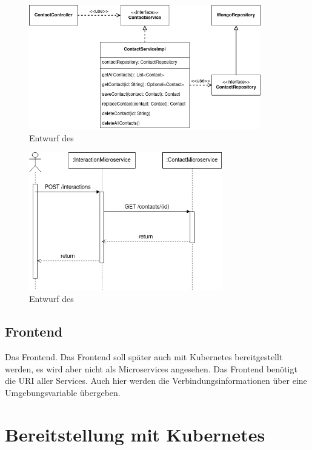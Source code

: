 \begin{figure}[H] 
    \centering
    \includegraphics[width=0.9\textwidth]{figures/UMLKlassenDiagram.png}
    \caption{Entwurf des}
\end{figure}

\begin{figure}[H] 
    \centering
    \includegraphics[width=0.75\textwidth]{figures/UMLSequenzdiagramm.png}
    \caption{Entwurf des}
\end{figure}

\subsection{Frontend}

Das Frontend. Das Frontend soll später auch mit Kubernetes bereitgestellt werden, es wird aber nicht als Microservices angesehen. Das Frontend benötigt die \ac{URI} aller Services. Auch hier werden die Verbindungsinformationen über eine Umgebungsvariable übergeben.

\clearpage
\section{Bereitstellung mit Kubernetes}

